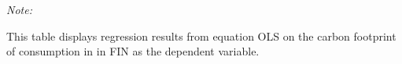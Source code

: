 \begin{table}[htbp!]
\begin{adjustbox}{width = 1\textwidth, max height = 0.95\textheight, center}
\begin{threeparttable}[b]
         \begin{tablenotes}\item \medskip \textit{Note:}
            \item This table displays regression results from equation OLS on the carbon footprint of consumption in  in FIN as the dependent variable.  
         \end{tablenotes}
      \end{threeparttable}
   \end{adjustbox}
\end{table}


